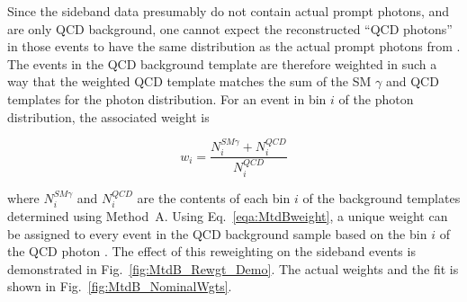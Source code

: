 Since the sideband data presumably do not contain actual prompt photons, and are only QCD background, one cannot expect the reconstructed ``QCD photons'' in those events to have the same \et distribution as the actual prompt photons from \pythiaText. The events in the QCD background template are therefore weighted in such a way that the weighted QCD template matches the sum of the \pythiaText SM $\gamma$ and QCD templates for the photon \et distribution. For an event in bin $i$ of the photon \et distribution, the associated weight is

\begin{equation}
w_i = \frac{N_i^{SM \gamma} + N_i^{QCD}}{N_i^{QCD}}\label{eqa:MtdBweight}
\end{equation}

\noindent where $N_i^{SM \gamma}$ and $N_i^{QCD}$ are the contents of each bin $i$ of the background templates determined using Method~A. Using Eq.~\ref{eqa:MtdBweight}, a unique weight can be assigned to every event in the QCD background sample based on the bin $i$ of the QCD photon \et. The effect of this reweighting on the sideband events is demonstrated in Fig.~\ref{fig:MtdB_Rewgt_Demo}. The actual weights and the fit is shown in Fig.~\ref{fig:MtdB_NominalWgts}.

